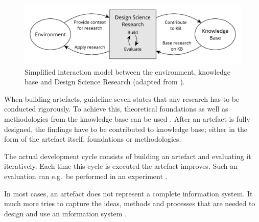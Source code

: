 \begin{figure}[H]
\begin{center}
  \includegraphics[scale=0.7]{images/figures/design_science_cycles.pdf}
\end{center}
\caption[Simplified interaction model between the environment, knowledge base and Design Science Research.]{Simplified interaction model between the environment, knowledge base and Design Science Research (adapted from \autocite[Fig. 1]{HevnerThreeCycleView2007}).}
\label{fig:design_science_cycles}
\end{figure}

When building artefacts, guideline seven states that any research has to be
conducted rigorously. To achieve this, theoretical foundations as well as
methodologies from the knowledge base can be used \autocite[p.
88]{VonAlanDesignscienceinformation2004}. After an artefact is fully designed,
the findings have to be contributed to knowledge base; either in the form of
the artefact itself, foundations or methodologies.

The actual development cycle consists of building an artefact and evaluating it
iteratively. Each time this cycle is executed the artefact improves. Such an
evaluation can e.g.\ be performed in an experiment \autocite[p.
91]{HevnerThreeCycleView2007}.

In most cases, an artefact does not represent a complete information system. It
much more tries to capture the ideas, methods and processes that are needed to
design and use an information system \autocite[p.
83]{VonAlanDesignscienceinformation2004}.

